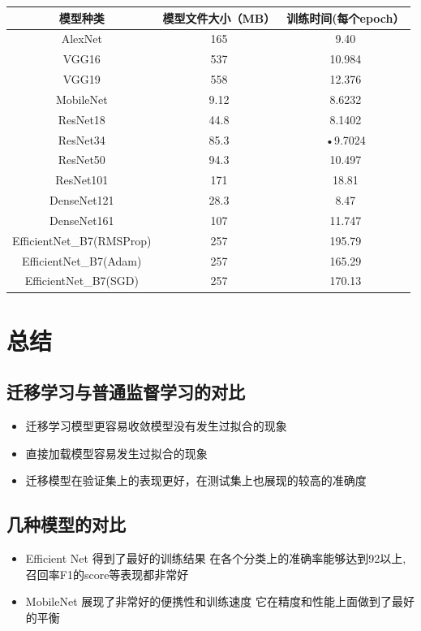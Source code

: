 \documentclass[UTF8]{ctexart}
\begin{document}
\begin{tabular}{|c|c|c|}
\hline 
模型种类 & 模型文件大小（MB） & 训练时间(每个epoch） \\ 
\hline 
AlexNet & 165 & 9.40 \\ 
\hline 
VGG16 & 537 &  10.984\\ 
\hline 
VGG19 & 558 & 12.376 \\ 
\hline 
MobileNet & 9.12 & 8.6232 \\ 
\hline 
ResNet18 & 44.8&8.1402  \\ 
\hline 
ResNet34 & 85.3 & •9.7024\\ 
\hline 
ResNet50& 94.3 & 10.497 \\ 
\hline 
ResNet101 & 171 & 18.81 \\ 
\hline 
DenseNet121& 28.3 & 8.47\\ 
\hline 
DenseNet161 & 107 & 11.747 \\ 
\hline 
EfficientNet\_B7(RMSProp) & 257 & 195.79\\ 
\hline
EfficientNet\_B7(Adam) & 257 & 165.29\\ 
EfficientNet\_B7(SGD) & 257 & 170.13\\ 
\hline
\end{tabular} 

\section{总结}
\subsection{迁移学习与普通监督学习的对比}
\begin{itemize}
\item 迁移学习模型更容易收敛模型没有发生过拟合的现象 
\item 直接加载模型容易发生过拟合的现象
\item 迁移模型在验证集上的表现更好，在测试集上也展现的较高的准确度
\end{itemize}

\subsection{几种模型的对比}
\begin{itemize}
\item Efficient Net 得到了最好的训练结果 在各个分类上的准确率能够达到92以上,召回率F1的score等表现都非常好
\item MobileNet 展现了非常好的便携性和训练速度 它在精度和性能上面做到了最好的平衡
\end{itemize}
\end{document}

